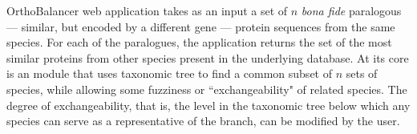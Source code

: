 OrthoBalancer web application takes as an input a set of  $n$ \emph{bona fide}
paralogous --- similar, but encoded by a different gene --- protein sequences from
the same species. For each of the paralogues, the application returns the set of
the most similar proteins from other species present in the underlying database.
At its core is an module that uses taxonomic tree to find a common subset
of $n$ sets of species, while allowing some fuzziness or ``exchangeability" of
related species.  The degree of exchangeability, that is, the level in the
taxonomic tree below which any species can serve as a representative of the
branch, can be modified by the user. 
